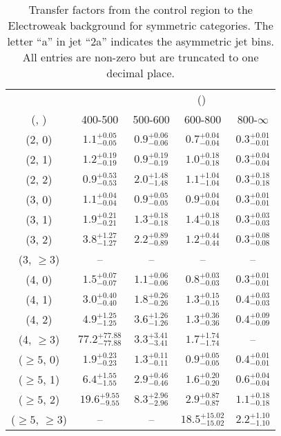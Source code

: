 \begin{table}[h!]
\tiny
\centering
\caption{Transfer factors from the \gj control region to the Electroweak background for symmetric categories. The letter ``a'' in jet \eg ``2a''  indicates the asymmetric jet bins. All entries are non-zero but are truncated to one decimal place.\label{tab:tf_total_gj_sym}}
\begin{tabular}
{ccccc}
	\hline\hline
&	& \multicolumn{4}{c}{\scalht (\gev)} \\ 
	 (\njet,  \nb) & 400-500 & 500-600 & 600-800 & 800-$\infty$ \\ [0.8ex] 
\hline
	(2, 0) & $1.1^{+ 0.05 }_{- 0.05 }$ & $0.9^{+ 0.06 }_{- 0.06 }$ & $0.7^{+ 0.04 }_{- 0.04 }$ & $0.3^{+ 0.01 }_{- 0.01 }$ \\[0.5ex] 
	(2, 1) & $1.2^{+ 0.19 }_{- 0.19 }$ & $0.9^{+ 0.19 }_{- 0.19 }$ & $1.0^{+ 0.18 }_{- 0.18 }$ & $0.3^{+ 0.04 }_{- 0.04 }$ \\[0.5ex] 
	(2, 2) & $0.9^{+ 0.53 }_{- 0.53 }$ & $2.0^{+ 1.48 }_{- 1.48 }$ & $1.1^{+ 1.04 }_{- 1.04 }$ & $0.3^{+ 0.18 }_{- 0.18 }$ \\[0.5ex] 
	(3, 0) & $1.1^{+ 0.04 }_{- 0.04 }$ & $0.9^{+ 0.05 }_{- 0.05 }$ & $0.9^{+ 0.04 }_{- 0.04 }$ & $0.3^{+ 0.01 }_{- 0.01 }$ \\[0.5ex] 
	(3, 1) & $1.9^{+ 0.21 }_{- 0.21 }$ & $1.3^{+ 0.18 }_{- 0.18 }$ & $1.4^{+ 0.18 }_{- 0.18 }$ & $0.3^{+ 0.03 }_{- 0.03 }$ \\[0.5ex] 
	(3, 2) & $3.8^{+ 1.27 }_{- 1.27 }$ & $2.2^{+ 0.89 }_{- 0.89 }$ & $1.2^{+ 0.44 }_{- 0.44 }$ & $0.3^{+ 0.08 }_{- 0.08 }$ \\[0.5ex] 
	(3, $\ge3$) & -- & -- & -- & -- \\[0.5ex] 
	(4, 0) & $1.5^{+ 0.07 }_{- 0.07 }$ & $1.1^{+ 0.06 }_{- 0.06 }$ & $0.8^{+ 0.03 }_{- 0.03 }$ & $0.3^{+ 0.01 }_{- 0.01 }$ \\[0.5ex] 
	(4, 1) & $3.0^{+ 0.40 }_{- 0.40 }$ & $1.8^{+ 0.26 }_{- 0.26 }$ & $1.3^{+ 0.15 }_{- 0.15 }$ & $0.4^{+ 0.03 }_{- 0.03 }$ \\[0.5ex] 
	(4, 2) & $4.9^{+ 1.25 }_{- 1.25 }$ & $3.6^{+ 1.26 }_{- 1.26 }$ & $1.3^{+ 0.36 }_{- 0.36 }$ & $0.4^{+ 0.09 }_{- 0.09 }$ \\[0.5ex] 
	(4, $\ge3$) & $77.2^{+ 77.88 }_{- 77.88 }$ & $3.3^{+ 3.41 }_{- 3.41 }$ & $1.7^{+ 1.74 }_{- 1.74 }$ & -- \\[0.5ex] 
	($\ge5$, 0) & $1.9^{+ 0.23 }_{- 0.23 }$ & $1.3^{+ 0.11 }_{- 0.11 }$ & $0.9^{+ 0.05 }_{- 0.05 }$ & $0.4^{+ 0.01 }_{- 0.01 }$ \\[0.5ex] 
	($\ge5$, 1) & $6.4^{+ 1.55 }_{- 1.55 }$ & $2.9^{+ 0.46 }_{- 0.46 }$ & $1.6^{+ 0.20 }_{- 0.20 }$ & $0.6^{+ 0.04 }_{- 0.04 }$ \\[0.5ex] 
	($\ge5$, 2) & $19.6^{+ 9.55 }_{- 9.55 }$ & $8.3^{+ 2.96 }_{- 2.96 }$ & $2.9^{+ 0.87 }_{- 0.87 }$ & $1.1^{+ 0.18 }_{- 0.18 }$ \\[0.5ex] 
	($\ge5$, $\ge3$) & -- & -- & $18.5^{+ 15.02 }_{- 15.02 }$ & $2.2^{+ 1.10 }_{- 1.10 }$ \\[0.5ex] 
	\hline
	\hline
\end{tabular}
\end{table}
